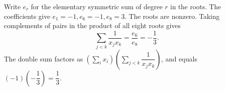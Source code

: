 Write $e_r$ for the elementary symmetric sum of degree $r$ in the roots. The coefficients give $e_1=-1,e_6=-1,e_8=3$. The roots are nonzero. Taking complements of pairs in the product of all eight roots gives
\[\sum_{j<k}\dfrac{1}{x_jx_k}=\dfrac{e_6}{e_8}=-\dfrac{1}{3}.\]
The double sum factors as $\left(\sum_i x_i\right)\left(\sum_{j<k}\dfrac{1}{x_jx_k}\right)$, and equals $(-1)(-\dfrac{1}{3})=\boxed{\dfrac{1}{3}}$.

